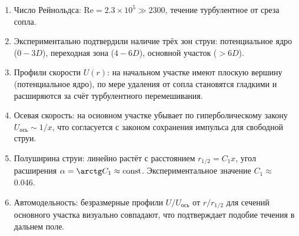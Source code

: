 \documentclass[12pt,a4paper]{article}
\newcommand{\ReNum}{\mathrm{Re}}
\begin{document}
\begin{enumerate}
    \item Число Рейнольдса: $\ReNum = 2.3 \times 10^5 \gg 2300$, течение турбулентное от среза сопла.
    
    \item Экспериментально подтвердили наличие трёх зон струи: потенциальное ядро ($0-3D$), переходная зона ($4-6D$), основной участок ($>6D$).
    
    \item Профили скорости $U(r)$: на начальном участке имеют плоскую вершину (потенциальное ядро), по мере удаления от сопла становятся гладкими и расширяются за счёт турбулентного перемешивания.
    
    \item Осевая скорость: на основном участке убывает по гиперболическому закону $U_{\text{ось}} \sim 1/x$, что согласуется с законом сохранения импульса для свободной струи.
    
    \item Полуширина струи: линейно растёт с расстоянием $r_{1/2} = C_1 x$, угол расширения $\alpha = \arctg C_1 \approx \text{const}$. Экспериментальное значение $C_1 \approx$ 0.046.
    
    \item Автомодельность: безразмерные профили $U/U_{\text{ось}}$ от $r/r_{1/2}$ для сечений основного участка визуально совпадают, что подтверждает подобие течения в дальнем поле.

\end{enumerate}


\end{document}
